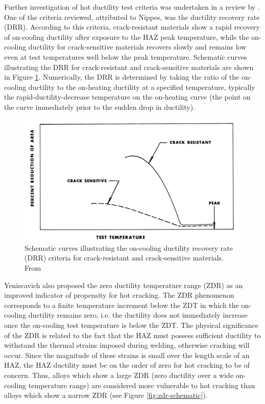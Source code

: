 Further investigation of hot ductility test criteria was undertaken in a review by \citet{yeniscavich_correlation_1970}. One of the criteria reviewed, attributed to Nippes, was the ductility recovery rate (DRR). According to this criteria, crack-resistant materials show a rapid recovery of on-cooling ductility after exposure to the HAZ peak temperature, while the on-cooling ductility for crack-sensitive materials recovers slowly and remains low even at test temperatures well below the peak temperature. Schematic curves illustrating the DRR for crack-resistant and crack-sensitive materials are shown in Figure \ref{fig:drr-schematic}. Numerically, the DRR is determined by taking the ratio of the on-cooling ductility to the on-heating ductility at a specified temperature, typically the rapid-ductility-decrease temperature on the on-heating curve (the point on the curve immediately prior to the sudden drop in ductility).

\begin{figure}
\centering
\includegraphics[width=6in]{figures/yeniscavich-drr.png}
\caption{Schematic curves illustrating the on-cooling ductility recovery rate (DRR) criteria for crack-resistant and crack-sensitive materials.  From \citet[Fig.~2]{yeniscavich_correlation_1970}}
\label{fig:drr-schematic}
\end{figure}

Yeniscavich also proposed the  zero ductility temperature range (ZDR) as an improved indicator of propensity for hot cracking. The ZDR phenomenon corresponds to a finite temperature increment below the ZDT in which the on-cooling ductility remains zero, i.e. the ductility does not immediately increase once the on-cooling test temperature is below the ZDT. The physical significance of the ZDR is related to the fact that the HAZ must possess sufficient ductility to withstand the thermal strains imposed during welding, otherwise cracking will occur. Since the magnitude of these strains is small over the length scale of an HAZ, the HAZ ductility must be on the order of zero for hot cracking to be of concern. Thus, alloys which show a large ZDR (zero ductility over a wide on-cooling temperature range) are considered more vulnerable to hot cracking than alloys which show a narrow ZDR (see Figure \ref{fig:zdr-schematic}).

